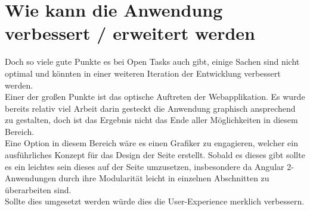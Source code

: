 \section{Wie kann die Anwendung verbessert / erweitert werden}

Doch so viele gute Punkte es bei Open Tasks auch gibt, einige Sachen sind nicht optimal und könnten in einer weiteren Iteration der Entwicklung verbessert werden. \\

Einer der großen Punkte ist das optische Auftreten der Webapplikation. Es wurde bereits relativ viel Arbeit darin gesteckt die Anwendung graphisch ansprechend zu gestalten, doch ist das Ergebnis nicht das Ende aller Möglichkeiten in diesem Bereich. \\
Eine Option in diesem Bereich wäre es einen Grafiker zu engagieren, welcher ein ausführliches Konzept für das Design der Seite erstellt. Sobald es dieses gibt sollte es ein leichtes sein dieses auf der Seite umzusetzen, insbesondere da Angular 2-Anwendungen durch ihre Modularität leicht in einzelnen Abschnitten zu überarbeiten sind.\\
Sollte dies umgesetzt werden würde dies die User-Experience merklich verbessern. \\

